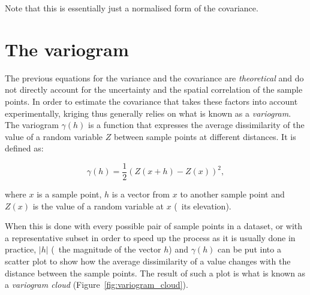 Note that this is essentially just a normalised form of the covariance.

\section{The variogram}

The previous equations for the variance and the covariance are \emph{theoretical} and do not directly account for the uncertainty and the spatial correlation of the sample points.
In order to estimate the covariance that takes these factors into account experimentally, kriging thus generally relies on what is known as a \emph{variogram}.
The variogram \(\gamma(h)\) is a function that expresses the average dissimilarity of the value of a random variable \(Z\) between sample points at different distances.
It is defined as:

\begin{equation}
\gamma(h) = \frac{1}{2} (Z(x+h) - Z(x))^2,
\end{equation}

where \(x\) is a sample point, \(h\) is a vector from \(x\) to another sample point and \(Z(x)\) is the value of a random variable at \(x\) (\eg\ its elevation).

When this is done with every possible pair of sample points in a dataset, or with a representative subset in order to speed up the process as it is usually done in practice, \(|h|\) (\ie\ the magnitude of the vector \(h\)) and \(\gamma(h)\) can be put into a scatter plot to show how the average dissimilarity of a value changes with the distance between the sample points.
The result of such a plot is what is known as a \emph{variogram cloud} (Figure~\ref{fig:variogram_cloud}).

